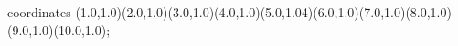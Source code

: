 					coordinates { (1.0,1.0)(2.0,1.0)(3.0,1.0)(4.0,1.0)(5.0,1.04)(6.0,1.0)(7.0,1.0)(8.0,1.0)(9.0,1.0)(10.0,1.0)};